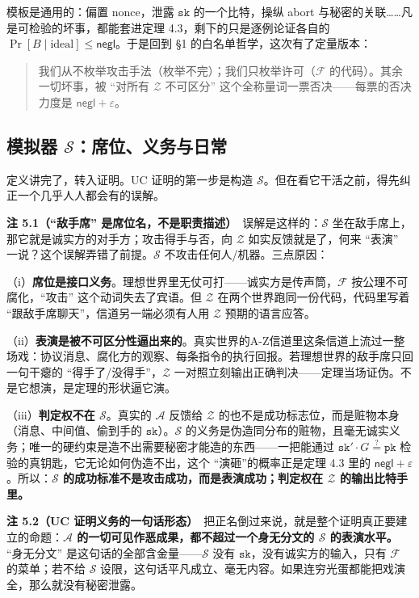模板是通用的：偏置 nonce，泄露 $\mathtt{sk}$ 的一个比特，操纵 abort
与秘密的关联\ldots\ldots 凡是可检验的坏事，都能套进定理
4.3，剩下的只是逐例论证各自的 $\Pr[B \mid \text{ideal}] \le \mathsf{negl}$。于是回到
§1 的白名单哲学，这次有了定量版本：

\begin{quote}
我们从不枚举攻击手法（枚举不完）；我们只枚举许可（$\mathcal{F}$ 的代码）。其余一切坏事，被
“对所有 $\mathcal{Z}$ 不可区分”
这个全称量词一票否决------每票的否决力度是 $\mathsf{negl} + \varepsilon$。
\end{quote}

\subsection{\texorpdfstring{模拟器 $\mathcal{S}$：席位、义务与日常}{模拟器\textbackslash mathcal\{S\}：席位、义务与日常}}

定义讲完了，转入证明。UC
证明的第一步是构造 $\mathcal{S}$。但在看它干活之前，得先纠正一个几乎人人都会有的误解。

\textbf{注 5.1（“敌手席”
是席位名，不是职责描述）}　误解是这样的：$\mathcal{S}$ 坐在敌手席上，那它就是诚实方的对手方；攻击得手与否，向 $\mathcal{Z}$ 如实反馈就是了，何来
“表演”
一说？这个误解弄错了前提。$\mathcal{S}$ 不攻击任何人/机器。三点原因：

（i）\textbf{席位是接口义务}。理想世界里无仗可打------诚实方是传声筒，$\mathcal{F}$ 按公理不可腐化，“攻击”
这个动词失去了宾语。但 $\mathcal{Z}$ 在两个世界跑同一份代码，代码里写着
“跟敌手席聊天”，信道另一端必须有人用 $\mathcal{Z}$ 预期的语言应答。

（ii）\textbf{表演是被不可区分性逼出来的}。真实世界的A-Z信道里这条信道上流过一整场戏：协议消息、腐化方的观察、每条指令的执行回报。若理想世界的敌手席只回一句干瘪的
“得手了/没得手”，$\mathcal{Z}$ 一对照立刻输出正确判决------定理当场证伪。不是它想演，是定理的形状逼它演。

（iii）\textbf{判定权不在 $\mathcal{S}$}。真实的 $\mathcal{A}$ 反馈给 $\mathcal{Z}$ 的也不是成功标志位，而是赃物本身（消息、中间值、偷到手的 $\mathtt{sk}$）。$\mathcal{S}$ 的义务是伪造同分布的赃物，且毫无诚实义务；唯一的硬约束是造不出需要秘密才能造的东西------一把能通过 $\mathtt{sk}' \cdot G \stackrel{?}{=} \mathtt{pk}$ 检验的真钥匙，它无论如何伪造不出，这个
“演砸”的概率正是定理 4.3
里的 $\mathsf{negl} + \varepsilon$。所以：\textbf{$\mathcal{S}$ 的成功标准不是攻击成功，而是表演成功；判定权在 $\mathcal{Z}$ 的输出比特手里。}

\textbf{注 5.2（UC
证明义务的一句话形态）}　把正名倒过来说，就是整个证明真正要建立的命题：\textbf{$\mathcal{A}$ 的一切可见作恶成果，都不超过一个身无分文的 $\mathcal{S}$ 的表演水平。}
“身无分文”
是这句话的全部含金量------$\mathcal{S}$ 没有 $\mathtt{sk}$，没有诚实方的输入，只有 $\mathcal{F}$ 的菜单；若不给 $\mathcal{S}$ 设限，这句话平凡成立、毫无内容。如果连穷光蛋都能把戏演全，那么就没有秘密泄露。

